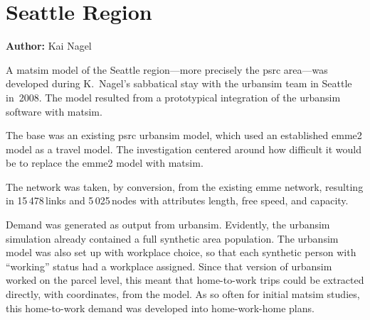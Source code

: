 \chapter{Seattle Region}
\label{ch:seattle}
\hfill \textbf{Author:} Kai Nagel


A \gls{matsim} model of the Seattle region---more precisely the \gls{psrc} area---was developed during K.\ Nagel's sabbatical stay with the \gls{urbansim} team in Seattle in~2008. The model resulted from a prototypical integration of the \gls{urbansim} software \citep[e.g.,][]{WaddellEtc2003UrbanSim} with \gls{matsim}. 

The base was an existing \gls{psrc} \gls{urbansim} model, which used an established \gls{emme2} model 
as a travel model. The investigation centered around how difficult it would be to replace the \gls{emme2} model with \gls{matsim}. 

The network was taken, by conversion, from the existing \gls{emme} network, resulting in 15\,478\,links and 5\,025\,nodes with attributes length, free speed, and capacity.

Demand was generated as output from \gls{urbansim}. Evidently, the \gls{urbansim} simulation already contained a full synthetic area population. The \gls{urbansim} model was also set up with workplace choice, so that each synthetic person with ``working'' status had a workplace assigned. Since that version of \gls{urbansim} worked on the parcel level, this meant that home-to-work trips could be extracted directly, with coordinates, from the model. As so often for initial \gls{matsim}  studies, this home-to-work demand was developed into home-work-home plans.

